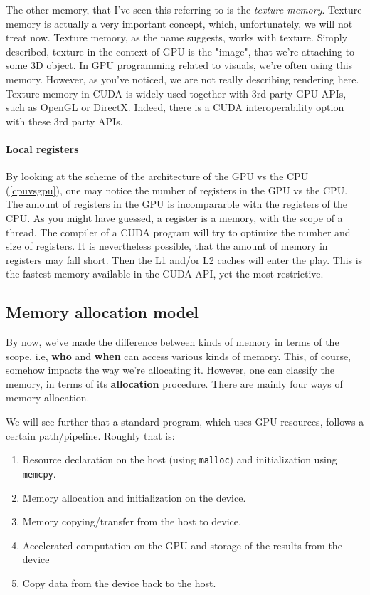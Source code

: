 The other memory, that I've seen this referring to is the \textit{texture memory}. Texture memory is actually a very important concept, which, unfortunately, 
we will not treat now. Texture memory, as the name suggests, works with texture. Simply described, texture in the context of 
GPU is the "image", that we're attaching to some 3D object. In GPU programming related to visuals, we're often using this memory. 
However, as you've noticed, we are not really describing rendering here. 
Texture memory in CUDA is widely used together with 3rd party GPU APIs, such as OpenGL or DirectX. Indeed, there is a CUDA interoperability 
option with these 3rd party APIs.


\paragraph{Local registers}
By looking at the scheme of the architecture of the GPU vs the CPU (\autoref{cpuvsgpu}), one may notice the number 
of registers in the GPU vs the CPU. The amount of registers in the GPU
is incompararble with the registers of the CPU. As you might have guessed, a 
register is a memory, with the scope of a thread. The compiler of a CUDA program will try to optimize the number and size of registers. 
It is nevertheless possible, that the amount of memory in registers may fall short. Then the L1 and/or L2 caches will enter the 
play. This is the fastest memory available in the CUDA API, yet the most restrictive.

\subsection{Memory allocation model}
\label{subsection:mem_alloc_model}
By now, we've made the difference between kinds of memory in terms of the scope, i.e, 
\textbf{who} and \textbf{when} can access various kinds of memory. This, of course, somehow impacts the way we're allocating it. 
However, one can classify the memory, in terms of its \textbf{allocation} procedure. There are mainly four ways of memory allocation.

We will see further that a standard
program, which uses GPU resources, follows a certain path/pipeline. 
Roughly that is: 
\begin{enumerate}
\setlength\itemsep{-0.1em}
  \item Resource declaration on the host (using \verb|malloc|) and initialization using \verb|memcpy|.
  \item Memory allocation and initialization on the device.
  \item Memory copying/transfer from the host to device.
  \item Accelerated computation on the GPU and storage of the results from the device
  \item Copy data from the device back to the host.
\end{enumerate}

